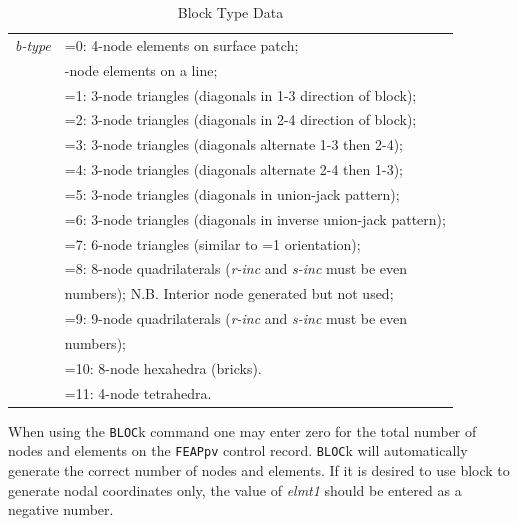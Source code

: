 \begin{table}
\begin{center}
\begin{tabular}{r l}
\it b-type &=0: 4-node elements on surface patch; \\
           &\qquad 2-node elements on a line; \\
           &=1: 3-node triangles (diagonals in 1-3 direction of block); \\
           &=2: 3-node triangles (diagonals in 2-4 direction of block); \\
           &=3: 3-node triangles (diagonals alternate 1-3 then 2-4); \\
           &=4: 3-node triangles (diagonals alternate 2-4 then 1-3); \\
           &=5: 3-node triangles (diagonals in union-jack pattern); \\
           &=6: 3-node triangles (diagonals in inverse union-jack pattern); \\
           &=7: 6-node triangles (similar to =1 orientation); \\
           &=8: 8-node quadrilaterals ({\it r-inc} and {\it s-inc} must be even \\
		   &\qquad numbers);  N.B. Interior node generated but not used; \\
           &=9: 9-node quadrilaterals ({\it r-inc} and {\it s-inc} must be even \\
           &\qquad numbers); \\
           &=10: 8-node hexahedra (bricks). \\
           &=11: 4-node tetrahedra.
\end{tabular}
\end{center}
\caption{Block Type Data}
\label{tblkt}
\end{table}

When using the {\tt BLOC}k command one may enter zero for the
total number of nodes and elements on the {\tt FEAPpv} control
record.  {\tt BLOC}k will automatically generate the correct
number of nodes and elements.
If it is desired to use block to generate nodal coordinates only, the
value of {\it elmt1} should be entered as a negative number.

